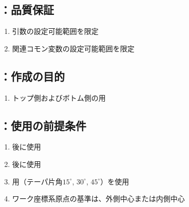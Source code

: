 \subsection{\KEndFaceOutCChamferRLeft：品質保証}
\begin{enumerate}[label*=\sarrow]
\item {}引数の設定可能範囲を限定
\item 関連コモン変数の設定可能範囲を限定
\end{enumerate}



\clearpage


\subsection{\KEndFaceCurvedOutCChamferRLeft：作成の目的}
\begin{enumerate}[label*=\sarrow]
\item トップ側およびボトム側の\CurvedOutcut 用\EndFaceOutChamferMilling
\end{enumerate}


\subsection{\KEndFaceCurvedOutCChamferRLeft：使用の前提条件}
\begin{enumerate}[label*=\sarrow]
\item \EndFacecutMilling 後に使用
\item \CurvedOutcutMilling 後に使用
\item \EndFaceCChamferMilling 用\TaperEndMill（テーパ片角$15^\circ$, $30^\circ$, $45^\circ$）を使用
\item {}ワーク座標系原点の基準は、\EndFace 外側中心または\EndFace 内側中心
\end{enumerate}


